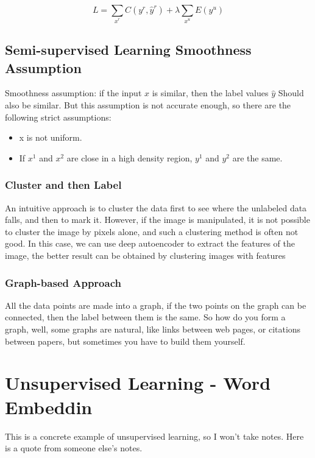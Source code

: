 \documentclass{article}
\begin{document}
$$
L = \sum_{x^r} C(y^r,\hat y^r) + \lambda \sum_{x^u} E(y^u)
$$

\subsection{Semi-supervised Learning Smoothness Assumption}

Smoothness assumption: if the input $x$ is similar, then the label values $\hat y$ Should also be similar. But this assumption is not accurate enough, so there are the following strict assumptions:

\begin{itemize}
    \item x is not uniform. 
    \item If $x^1$ and $x^2$ are close in a high density region, $y^1$ and $y^2$ are the same.
\end{itemize}

\subsubsection{Cluster and then Label}

An intuitive approach is to cluster the data first to see where the unlabeled data falls, and then to mark it. However, if the image is manipulated, it is not possible to cluster the image by pixels alone, and such a clustering method is often not good. In this case, we can use deep autoencoder to extract the features of the image, the better result can be obtained by clustering images with features

\subsubsection{Graph-based Approach}

All the data points are made into a graph, if the two points on the graph can be connected, then the label between them is the same. So how do you form a graph, well, some graphs are natural, like links between web pages, or citations between papers, but sometimes you have to build them yourself.

\section{Unsupervised Learning - Word Embeddin}

This is a concrete example of unsupervised learning, so I won't take notes. Here is a quote from someone else's notes.
\end{document}

